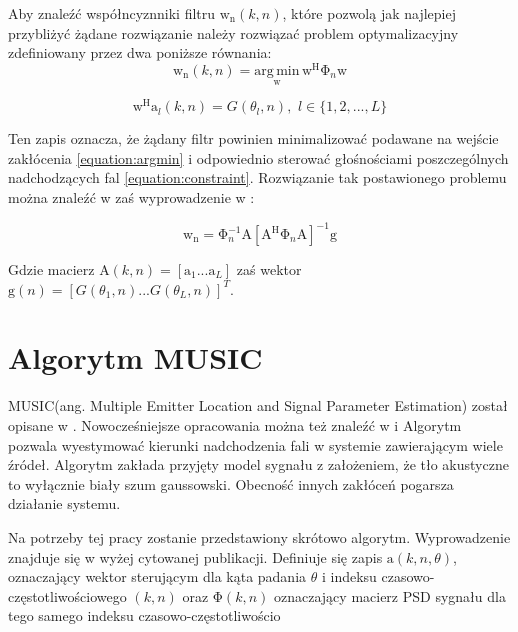 \noindent Aby znaleźć współncyznniki filtru $\bm{\mathrm{w}}_{\mathrm{n}}(k,n)$, które pozwolą jak najlepiej przybliżyć żądane rozwiązanie należy rozwiązać problem optymalizacyjny zdefiniowany przez dwa poniższe równania:
\begin{equation}
    \label{equation:argmin}
    \bm{\mathrm{w}}_{\mathrm{n}}(k,n) = 
    \underset{\bm{\mathrm{w}}}{\mathrm{arg \, min}} \,
    \bm{\mathrm{w}}^{\mathrm{H}}
    \bm{\mathrm{\Phi}}_{n}
    \bm{\mathrm{w}}
\end{equation}

\begin{equation}
    \label{equation:constraint}
    \bm{\mathrm{w}}^{\mathrm{H}}
    \bm{\mathrm{a}}_{l}(k,n)=
    G(\theta_{l},n),
    \, \, l \in \{1,2,...,L\}
\end{equation}

Ten zapis oznacza, że żądany filtr powinien minimalizować podawane na wejście zakłócenia \ref{equation:argmin} i odpowiednio sterować głośnościami poszczególnych nadchodzących fal \ref{equation:constraint}. Rozwiązanie tak postawionego problemu można znaleźć w \cite{Thiergart2013} zaś wyprowadzenie w \cite{Frost1972}:

\begin{equation}
    \label{equation:lcmv formula}
    \bm{\mathrm{w}}_{\mathrm{n}}=
    \bm{\mathrm{\Phi}}_{n}^{-1}\bm{\mathrm{A}}
    [\bm{\mathrm{A}}^{\mathrm{H}} \bm{\mathrm{\Phi}}_{n} \bm{\mathrm{A}}]^{-1}
    \bm{\mathrm{g}}
\end{equation}

\noindent Gdzie macierz $\bm{\mathrm{A}}(k,n)=
[\bm{\mathrm{a}}_{1}...\bm{\mathrm{a}}_{L}]$ zaś wektor $\bm{\mathrm{g}}(n)=[G(\theta_{1},n)...G(\theta_{L},n)]^{T}$.

\section{Algorytm MUSIC}

MUSIC(ang. Multiple Emitter Location and Signal Parameter Estimation) został opisane w \cite{Schmidt1986}. Nowocześniejsze opracowania można też znaleźć w \cite{DOA} i \cite{Benesty2008} Algorytm pozwala wyestymować kierunki nadchodzenia fali w systemie zawierającym wiele źródeł. Algorytm zakłada przyjęty model sygnału z założeniem, że tło akustyczne to wyłącznie biały szum gaussowski. Obecność innych zakłóceń pogarsza działanie systemu.

\noindent Na potrzeby tej pracy zostanie przedstawiony skrótowo algorytm. Wyprowadzenie znajduje się w wyżej cytowanej publikacji. 
Definiuje się zapis $\bm{\mathrm{a}}(k,n,\theta)$, oznaczający wektor sterującym dla kąta padania $\theta$ i indeksu czasowo-częstotliwościowego $(k,n)$ oraz $\bm{\mathrm{\Phi}}(k,n)$ oznaczający macierz PSD sygnału dla tego samego indeksu czasowo-częstotliwościo

